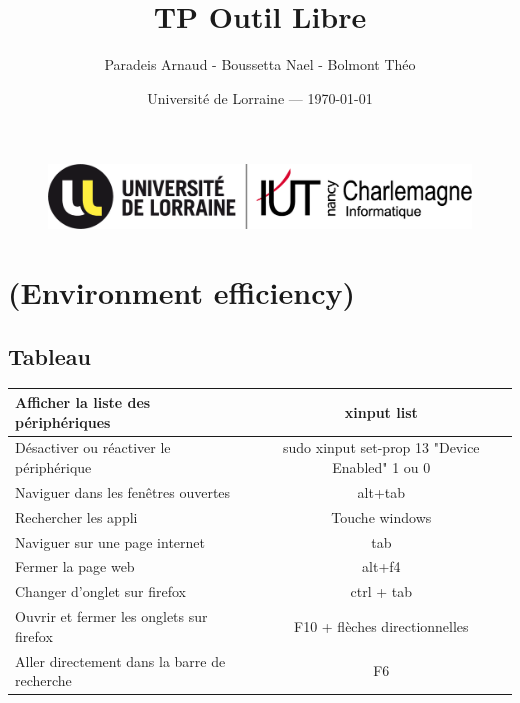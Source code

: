 \documentclass{article}
\title{TP Outil Libre} %
\author{Paradeis Arnaud - Boussetta Nael - Bolmont Théo} %
\date{Université de Lorraine --- \today} %
\begin{document}
\maketitle %

\begin{figure}[ht]
\centering
\includegraphics{image/logo_ul.png}
\end{figure}






\section{(Environment efficiency)}

\subsection{Tableau} %

\begin{center}
   \begin{tabular}{| l | c | }
     \hline
     Afficher la liste des périphériques & xinput list \\ \hline
     Désactiver ou réactiver le périphérique & sudo xinput set-prop 13 "Device Enabled" 1 ou  0 \\ \hline
     Naviguer dans les fenêtres ouvertes & alt+tab \\ \hline
     Rechercher les appli & Touche windows \\ \hline
     Naviguer sur une page internet & tab   \\ \hline
     Fermer la page web & alt+f4 \\ \hline
     Changer d'onglet sur firefox & ctrl + tab   \\ \hline
     Ouvrir et fermer les onglets sur firefox & F10 + flèches directionnelles \\ \hline
     Aller directement dans la barre de recherche & F6 \\ \hline
   \end{tabular}
 \end{center}
\end{document}
